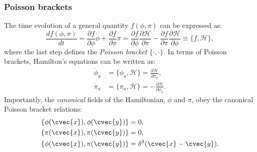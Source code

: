 \subsubsection{Poisson brackets}

The time evolution of a general quantity $f(\phi, \pi)$ can be expressed as:
\begin{equation}
	\label{eq:01_qft_hamiltonian_time_evolution_f}
	\frac{df(\phi, \pi)}{dt} = \frac{\partial f}{\partial\phi}\dot\phi + \frac{\partial f}{\partial\pi}\dot\pi = \frac{\partial f}{\partial\phi}\frac{\partial\mathcal H}{\partial\pi} - \frac{\partial f}{\partial\pi}\frac{\partial\mathcal H}{\partial\phi} \equiv \{f, \mathcal H\},
\end{equation}
where the last step defines the \textit{Poisson bracket} $\{\cdot, \cdot\}$.
In terms of Poisson brackets, Hamilton's equations can be written as:
\begin{equation}
	\label{eq:01_qft_hamiltonian_eoms_poisson}
	\begin{split}
		\dot\phi_a &= \{\phi_a, \mathcal H\} = \frac{\partial\mathcal H}{\partial\pi_a}, \\
		\dot\pi_a &= \{\pi_a, \mathcal H\} = -\frac{\partial\mathcal H}{\partial\phi_a}.
	\end{split}
\end{equation}
Importantly, the \textit{canonical} fields of the Hamiltonian, $\phi$ and $\pi$, obey the canonical Poisson bracket relations:
\begin{equation}
	\label{eq:01_qft_hamiltonian_canonical_poisson}
	\begin{split}
		\{\phi(\cvec{x}), \phi(\cvec{y})\} &= 0, \\
		\{\pi(\cvec{x}), \pi(\cvec{y})\} &= 0, \\
		\{\phi(\cvec{x}), \pi(\cvec{y})\} &= \delta^3(\cvec{x} - \cvec{y}).
	\end{split}
\end{equation}

